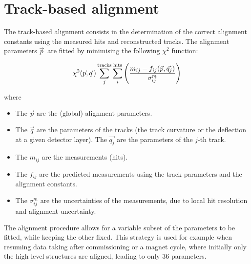 \section{Track-based alignment}
The track-based alignment consists in the determination of the correct alignment constants using the measured hits and reconstructed tracks.
The alignment parameters $\vec{p}\,$ are fitted by minimising the following $\chi^2$ function:

\begin{equation}
  \chi^2(\vec{p}, \vec{q}\,) \sum_j^{\rm tracks} \sum_i^{\rm hits} \left( \frac{m_{ij} - f_{ij}(\vec{p}, \vec{q_j})}{\sigma_{ij}^{m}} \right)
\end{equation}

where
\begin{itemize}
  \item The $\vec{p}$ are the (global) alignment parameters.
  \item The $\vec{q}$ are the parameters of the tracks (\eg the track curvature or the deflection at a given detector layer).
    The $\vec{q_j}$ are the parameters of the $j$-th track.
  \item The $m_{ij}$ are the measurements (hits).
  \item The $f_{ij}$ are the predicted measurements using the track parameters and the alignment constants.
  \item The $\sigma^m_{ij}$ are the uncertainties of the measurements, due to local hit resolution and alignment uncertainty.
\end{itemize}

The alignment procedure allows for a variable subset of the parameters to be fitted, while keeping the other fixed.
This strategy is used for example when resuming data taking after commissioning or a magnet cycle, where initially only the high level structures are aligned,
leading to only 36 parameters.

